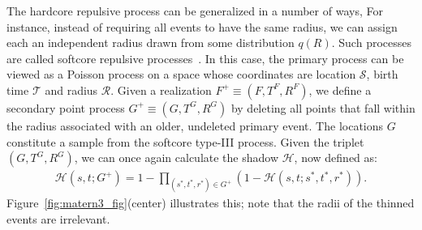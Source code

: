 \documentclass{statsoc}
\begin{document}
The hardcore repulsive process can be generalized in a number of ways, %
For instance, instead of requiring all 
\matern events to have the same radius, we can assign each an independent radius drawn from 
some distribution $q(R)$. Such \matern processes are called softcore repulsive processes~\citep{Hube:Wolp:2009}. In this case, the primary process
can be viewed as a Poisson process on a space whose coordinates are location $\mathcal{S}$, birth time $\mathcal{T}$ and radius
$\mathcal{R}$. Given a realization $F^+ \equiv (F, T^F, R^F)$, we define a secondary point process $G^+ \equiv (G, T^G, R^G)$ by deleting 
all points that fall within the radius associated with an older, undeleted primary event.  The locations $G$ constitute a sample from the 
softcore \matern type-III process. %
Given the triplet $(G, T^G, R^G)$, we can once again calculate the shadow $\mathscr{H}$, now defined as: 
\begin{align}
  \mathscr{H}(s,t;G^+) = 1 - \!\!\!\!\!\!\!\!\!\!\! \prod_{(s^*,t^*, r^*) \in G^+} \!\!\!\!\!\!\!\!\!\! \left( 1 - \mathscr{H}(s,t;s^*,t^*, r^*) \right).
\end{align}
Figure~\ref{fig:matern3_fig}(center) illustrates this; note that the radii of the thinned events are irrelevant. 
\end{document}

